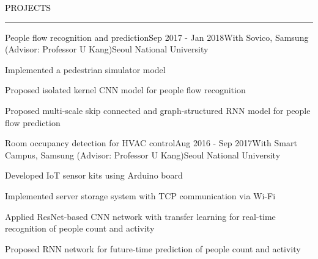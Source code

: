 \documentclass{resume} %
\renewenvironment{rSection}[1]{
	\sectionskip
	\textcolor{Black}{\MakeUppercase{#1}}
	\sectionlineskip
	\hrule
	\begin{list}{}{
			\setlength{\leftmargin}{1.5em}
		}
		\item[]
	}{
	\end{list}
}
\begin{document}
\begin{rSection}{Projects}
	\begin{rSubsection}{People flow recognition and prediction}{Sep 2017 - Jan 2018}{With Sovico, Samsung (Advisor: Professor U Kang)}{Seoul National University}
		\item Implemented a pedestrian simulator model
		\item Proposed isolated kernel CNN model for people flow recognition
		\item Proposed multi-scale skip connected and graph-structured RNN model for people flow prediction
	\end{rSubsection}	
	\begin{rSubsection}{Room occupancy detection for HVAC control}{Aug 2016 - Sep 2017}{With Smart Campus, Samsung (Advisor: Professor U Kang)}{Seoul National University}
		\item Developed IoT sensor kits using Arduino board
		\item Implemented server storage system with TCP communication via Wi-Fi
		\item Applied ResNet-based CNN network with transfer learning for real-time recognition of people count and activity
		\item Proposed RNN network for future-time prediction of people count and activity
	\end{rSubsection}	
	
\end{rSection}

	
%		
	
\end{document}
